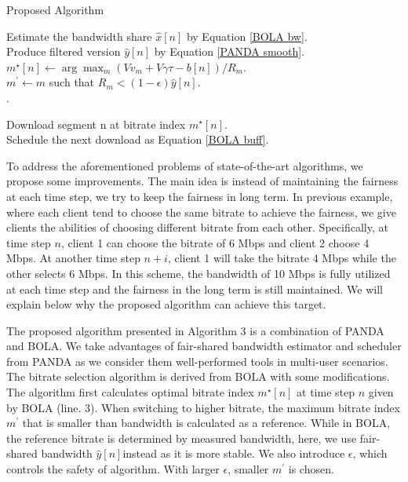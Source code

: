 \documentclass[journal]{IEEEtran}
\begin{document}
\begin{algorithm}
	
	
	\caption{Proposed Algorithm}
	
		
	{
     \nl Estimate the bandwidth share $\hat{x}[n]$ by Equation \ref{BOLA bw}.\\
    
   \nl Produce filtered version $\hat{y}[n]$ by Equation \ref{PANDA smooth}.\\
   \nl $
    	m^{\star}[n]\leftarrow\arg\max_{m}(Vv_{m}+V\gamma\tau-b[n])/R_{m}.$ 
    	\\
    \nl {} {
    \nl $m^{\prime}\leftarrow m$ such that $R_{m}<(1-\epsilon)\hat{y}[n]$.\\
    \nl {}
   \nl {}
    {
   \nl {}.
    }
    }

\nl Download segment n at bitrate index $m^{\star}[n]$.\\
\nl Schedule the next download as Equation \ref{BOLA buff}.
}
		
\end{algorithm}
\par To address the aforementioned problems of state-of-the-art algorithms, we propose some improvements. The main idea is instead of maintaining the fairness at each time step, we try to keep the fairness in long term. In previous example, where each client tend to choose the same bitrate to achieve the fairness, we give clients the abilities of choosing different bitrate from each other. Specifically, at time step $n$, client 1 can choose the bitrate of 6 Mbps and client 2 choose 4 Mbps. At another time step $n+i$, client 1 will take the bitrate 4 Mbps while the other selects 6 Mbps. In this scheme, the bandwidth of 10 Mbps is fully utilized at each time step and the fairness in the long term is still maintained. We will explain below why the proposed algorithm can achieve this target. 
\par The proposed algorithm presented in Algorithm 3 is a combination of PANDA and BOLA. We take advantages of fair-shared bandwidth estimator and scheduler from PANDA as we consider them well-performed tools in multi-user scenarios. The bitrate selection algorithm is derived from BOLA with some modifications. The algorithm first calculates optimal bitrate index $m^{\star}[n]$ at time step $n$ given by BOLA (line. 3). When switching to higher bitrate, the maximum bitrate index $m^{\prime}$ that is smaller than bandwidth is calculated as a reference. While in BOLA, the reference bitrate is determined by measured bandwidth, here, we use fair-shared bandwidth $\hat{y}[n]$instead as it is more stable. We also introduce $\epsilon$, which controls the safety of algorithm. With larger $\epsilon$, smaller $m^{\prime}$ is chosen.
\end{document}
